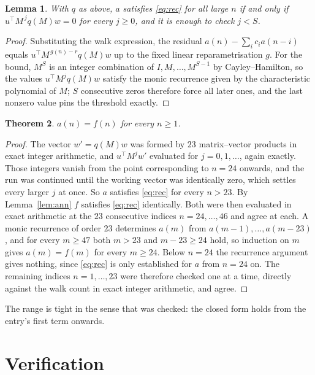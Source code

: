 \documentclass[11pt,a4paper]{article}
\theoremstyle{plain}
\newtheorem{theorem}{Theorem}
\newtheorem{lemma}[theorem]{Lemma}
\theoremstyle{definition}
\begin{document}
\begin{lemma}\label{lem:crit}
With $q$ as above, $a$ satisfies \eqref{eq:rec} for all large $n$ if and only if
$u^{\!\top}M^{\,j}q(M)w=0$ for every $j\ge0$, and it is enough to check $j<S$.
\end{lemma}

\begin{proof}
Substituting the walk expression, the residual $a(n)-\sum_ic_ia(n-i)$ equals
$u^{\!\top}M^{\,g(n)-r}q(M)w$ up to the fixed linear reparametrisation $g$. For the bound,
$M^{S}$ is an integer combination of $I,M,\dots,M^{S-1}$ by Cayley--Hamilton, so the values
$u^{\!\top}M^{j}q(M)w$ satisfy the monic recurrence given by the characteristic polynomial of
$M$; $S$ consecutive zeros therefore force all later ones, and the last nonzero value pins the
threshold exactly.
\end{proof}

\begin{theorem}
$a(n)=f(n)$ for every $n\ge1$.
\end{theorem}

\begin{proof}
The vector $w'=q(M)w$ was formed by $23$ matrix--vector products in exact integer
arithmetic, and $u^{\!\top}M^{j}w'$ evaluated for $j=0,1,\dots$, again exactly. Those integers
vanish from the point corresponding to $n=24$ onwards, and the run was continued until the
working vector was identically zero, which settles every larger $j$ at once. So $a$ satisfies
\eqref{eq:rec} for every $n>23$. By Lemma~\ref{lem:ann} $f$ satisfies \eqref{eq:rec}
identically. Both were then evaluated in exact arithmetic at the $23$ consecutive indices
$n=24,\dots,46$ and agree at each. A monic recurrence of order $23$
determines $a(m)$ from $a(m-1),\dots,a(m-23)$, and for every $m\ge47$ both
$m>23$ and $m-23\ge24$ hold, so induction on $m$ gives $a(m)=f(m)$ for every
$m\ge24$.
Below $n=24$ the recurrence argument gives nothing, since \eqref{eq:rec} is only
established for $a$ from $n=24$ on. The remaining indices $n=1,\dots,23$ were
therefore checked one at a time, directly against the walk count in exact integer arithmetic,
and agree.
\end{proof}

The range is tight in the sense that was checked: the closed form holds from the entry's first term onwards.

\section{Verification}
\end{document}
